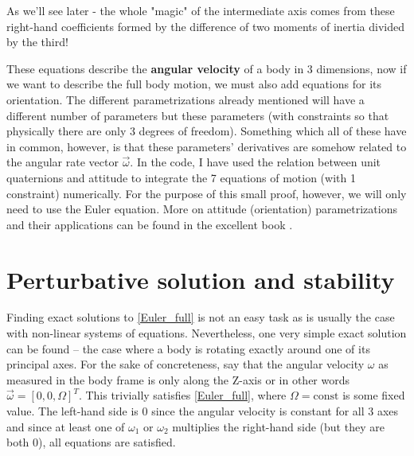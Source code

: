 \documentclass[a4paper]{article}
\begin{document}
	As we'll see later - the whole "magic" of the intermediate axis comes from these right-hand coefficients formed by the difference of two moments of inertia divided by the third!

	These equations describe the \textbf{angular velocity} of a body in 3 dimensions, now if we want to describe the full body motion, we must also add equations for its orientation.
	The different parametrizations already mentioned will have a different number of parameters but these parameters (with constraints so that physically there are only 3 degrees of freedom).
	Something which all of these have in common, however, is that these parameters' derivatives are somehow related to the angular rate vector $\vec{\omega}$.
	In the code, I have used the relation between unit quaternions and attitude to integrate the 7 equations of motion (with 1 constraint) numerically.
	For the purpose of this small proof, however, we will only need to use the Euler equation.
	More on attitude (orientation) parametrizations and their applications can be found in the excellent book \cite{ADCS_bible}.

	\section{Perturbative solution and stability}

	Finding exact solutions to \eqref{Euler_full} is not an easy task as is usually the case with non-linear systems of equations.
	Nevertheless, one very simple exact solution can be found -- the case where a body is rotating exactly around one of its principal axes.
	For the sake of concreteness, say that the angular velocity $\omega$ as measured in the body frame is only along the Z-axis or in other words $\vec{\omega} = [ 0 , 0 , \Omega ]^T$.
	This trivially satisfies \eqref{Euler_full}, where $\Omega = \mathrm{const}$ is some fixed value.
	The left-hand side is 0 since the angular velocity is constant for all 3 axes and since at least one of $\omega_1$ or $\omega_2$ multiplies the right-hand side (but they are both 0), all equations are satisfied.
\end{document}
